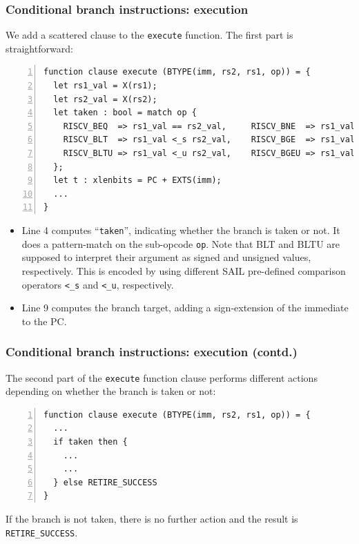 \documentclass[aspectratio=169]{beamer}
\newcommand{\slidefont}{\scriptsize}
\newcommand{\cf}{\scriptsize\tt}
\begin{document}
\begin{frame}[fragile]
  \frametitle{Conditional branch instructions: execution}

  \slidefont

  We add a scattered clause to the {\cf execute} function.  The first part is straightforward:

  \vspace{1ex}

  \begin{Verbatim}[frame=single, numbers=left, label = File riscv\_types.sail]
function clause execute (BTYPE(imm, rs2, rs1, op)) = {
  let rs1_val = X(rs1);
  let rs2_val = X(rs2);
  let taken : bool = match op {
    RISCV_BEQ  => rs1_val == rs2_val,     RISCV_BNE  => rs1_val != rs2_val,
    RISCV_BLT  => rs1_val <_s rs2_val,    RISCV_BGE  => rs1_val >=_s rs2_val,
    RISCV_BLTU => rs1_val <_u rs2_val,    RISCV_BGEU => rs1_val >=_u rs2_val
  };
  let t : xlenbits = PC + EXTS(imm);
  ...
}
  \end{Verbatim}

  \begin{minipage}{\textwidth}
    \begin{itemize}
    \item Line 4 computes ``{\cf taken}'', indicating whether the
      branch is taken or not.  It does a pattern-match on the
      sub-opcode {\cf op}.  Note that BLT and BLTU are supposed to
      interpret their argument as signed and unsigned values,
      respectively.  This is encoded by using different SAIL
      pre-defined comparison operators {\cf <\_s} and {\cf <\_u},
      respectively.
    \item Line 9 computes the branch target, adding a sign-extension of the immediate to the PC.
    \end{itemize}
  \end{minipage}


\end{frame}


\begin{frame}[fragile]
  \frametitle{Conditional branch instructions: execution (contd.)}

  \slidefont

  The second part of the {\cf execute} function clause performs
  different actions depending on whether the branch is taken or not:

  \vspace{1ex}

  \begin{Verbatim}[frame=single, numbers=left, label = File riscv\_types.sail]
function clause execute (BTYPE(imm, rs2, rs1, op)) = {
  ...
  if taken then {
    ...
    ...
  } else RETIRE_SUCCESS
}
  \end{Verbatim}

  \begin{minipage}{\textwidth}
    If the branch is not taken, there is no further action and the
    result is {\cf RETIRE\_SUCCESS}.
  \end{minipage}

\end{frame}
\end{document}
